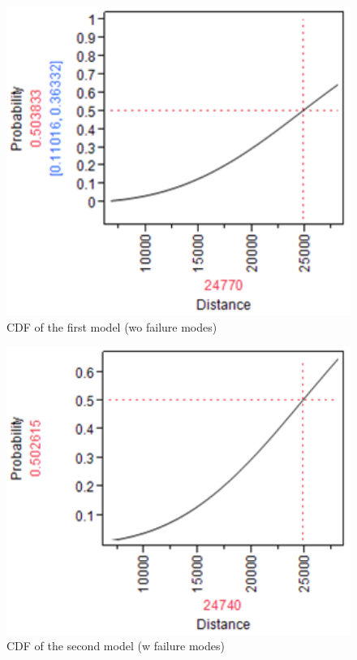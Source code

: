 \documentclass{article}
\begin{document}
\begin{enumerate}
\begin{enumerate}
\begin{enumerate}
  \begin{center}
        \FloatBarrier
      \begin{figure}
        \centering
        \includegraphics[width = 5in]{problem5_fit_dist1.png}
        \caption{CDF of the first model (wo failure modes)}
      \end{figure}
      \FloatBarrier
  \end{center}
  
  \begin{center}
        \FloatBarrier
      \begin{figure}
        \centering
        \includegraphics[width = 5in]{problem5_fit_dist2.png}
        \caption{CDF of the second model (w failure modes)}
      \end{figure}
      \FloatBarrier
  \end{center}
 

\end{enumerate}
\end{enumerate}
\end{enumerate}
\end{document}
